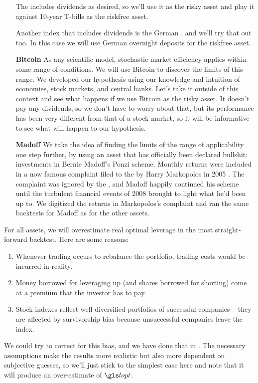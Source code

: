 \begin{itemize}
\item[\bf \SPT]
The \SPT includes dividends as desired, so we'll use it as the risky asset and play it against 10-year T-bills as the riskfree asset.
\item[\bf \DAX]
Another index that includes dividends is the German \DAX, and we'll try that out too. In this case we will use German overnight deposits for the riskfree asset.
\item[\bf Bitcoin]
As any scientific model, stochastic market efficiency applies within some range of conditions. We will use Bitcoin to discover the limits of this range. We developed our hypothesis using our knowledge and intuition of economies, stock markets, and central banks. Let's take it outside of this context and see what happens if we use Bitcoin as the risky asset. It doesn't pay any dividends, so we don't have to worry about that, but its performance has been very different from that of a stock market, so it will be informative to see what will happen to our hypothesis. 
\item[\bf Madoff]
We take the idea of finding the limits of the range of applicability one step further, by using an asset that has officially been declared bullshit: investments in Bernie Madoff's Ponzi scheme. Monthly returns were included in a now famous complaint filed to the \SEC by Harry Markopolos in 2005 \cite{Markopolos2005}. The complaint was ignored by the \SEC, and Madoff happily continued his scheme until the turbulent financial events of 2008 brought to light what he'd been up to. We digitized the returns in Markopolos's complaint and ran the same backtests for Madoff as for the other assets.
\end{itemize}

For all assets, we will overestimate real optimal leverage in the most straight-forward backtest. Here are some reasons: 
\begin{enumerate}
\item Whenever trading occurs to rebalance the portfolio, trading costs would be incurred in reality. 
\item Money borrowed for leveraging up (and shares borrowed for shorting) come at a premium that the investor has to pay. 
\item Stock indexes reflect well diversified portfolios of successful companies -- they are affected by survivorship bias because unsuccessful companies leave the index. 
\end{enumerate}
We could try to correct for this bias, and we have done that in \cite{PetersAdamou2011}. The necessary assumptions make the results more realistic but also more dependent on subjective guesses, so we'll just stick to the simplest case here and note that it will produce an over-estimate of $\lopt$.
\FloatBarrier

